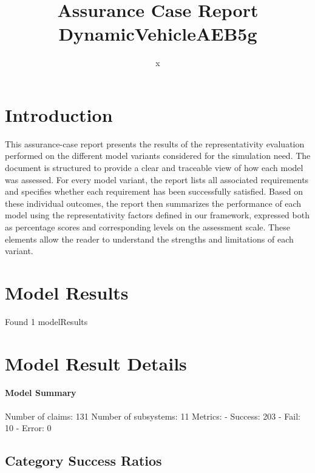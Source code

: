 \documentclass{article}
\title{Assurance Case Report DynamicVehicleAEB5g}
\author{x}
\begin{document}
	\maketitle
	\section{Introduction}
	This assurance-case report presents the results of the 
	representativity evaluation performed on the different model variants considered for 
	the simulation need. The document is structured to provide a clear and traceable view of how 
	each model was assessed. For every model variant, the report lists all associated requirements
	 and specifies whether each requirement has been successfully satisfied. Based on these 
	individual outcomes, the report then summarizes the performance of each model using the 
	representativity factors defined in our framework, expressed both as percentage scores 
	and corresponding levels on the assessment scale. These elements allow the reader to understand 
	the strengths and limitations of each variant.
	 
	\section{Model Results}
    Found 1 modelResults
		
			\section{Model Result Details} 
			\paragraph{Model Summary}
			Number of claims: 131
			Number of subsystems: 11
			Metrics:
			- Success: 203
			- Fail: 10
			- Error: 0
			
	

					\subsection{Category Success Ratios}
						
\end{document}
